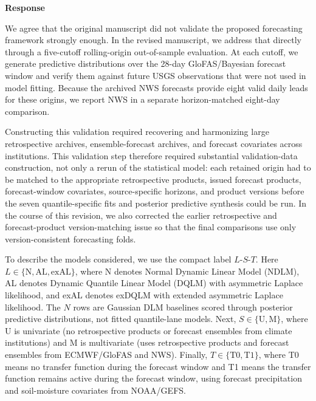 \documentclass[11pt,letterpaper]{article}
\newcommand{\responseheading}{%
  \vspace{2pt}\noindent\textbf{Response}\par
}
\newenvironment{responsebox}{\begin{mdframed}[style=plainbox]}{\end{mdframed}}
\begin{document}
\responseheading
\begin{responsebox}
We agree that the original manuscript did not validate the proposed forecasting framework strongly enough. In the revised manuscript, we address that directly through a five-cutoff rolling-origin out-of-sample evaluation. At each cutoff, we generate predictive distributions over the 28-day GloFAS/Bayesian forecast window and verify them against future USGS observations that were not used in model fitting. Because the archived NWS forecasts provide eight valid daily leads for these origins, we report NWS in a separate horizon-matched eight-day comparison.

Constructing this validation required recovering and harmonizing large retrospective archives, ensemble-forecast archives, and forecast covariates across institutions. This validation step therefore required substantial validation-data construction, not only a rerun of the statistical model: each retained origin had to be matched to the appropriate retrospective products, issued forecast products, forecast-window covariates, source-specific horizons, and product versions before the seven quantile-specific fits and posterior predictive synthesis could be run. In the course of this revision, we also corrected the earlier retrospective and forecast-product version-matching issue so that the final comparisons use only version-consistent forecasting folds.

To describe the models considered, we use the compact label \(L\)-\(S\)-\(T\). Here \(L\in\{\mathrm{N},\mathrm{AL},\mathrm{exAL}\}\), where N denotes Normal Dynamic Linear Model (NDLM), AL denotes Dynamic Quantile Linear Model (DQLM) with asymmetric Laplace likelihood, and exAL denotes exDQLM with extended asymmetric Laplace likelihood. The \(N\) rows are Gaussian DLM baselines scored through posterior predictive distributions, not fitted quantile-lane models. Next, \(S\in\{\mathrm{U},\mathrm{M}\}\), where U is univariate (no retrospective products or forecast ensembles from climate institutions) and M is multivariate (uses retrospective products and forecast ensembles from ECMWF/GloFAS and NWS). Finally, \(T\in\{\mathrm{T0},\mathrm{T1}\}\), where T0 means no transfer function during the forecast window and T1 means the transfer function remains active during the forecast window, using forecast precipitation and soil-moisture covariates from NOAA/GEFS.


\end{responsebox}
\end{document}
